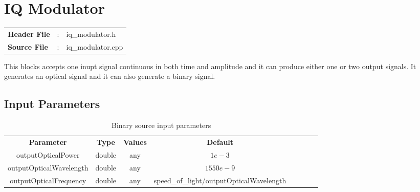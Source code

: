 \clearpage

\section{IQ Modulator}

\begin{tcolorbox}	
	\begin{tabular}{p{2.75cm} p{0.2cm} p{10.5cm}} 	
		\textbf{Header File}   &:& iq\_modulator.h \\
		\textbf{Source File}   &:& iq\_modulator.cpp \\
	\end{tabular}
\end{tcolorbox}

This blocks accepts one inupt signal continuous in both time and amplitude and it can produce either one or two output signals. It generates an optical signal and it can also generate a binary signal.

\subsection*{Input Parameters}

\begin{table}[h]
	\centering
	\begin{tabular}{|c|c|c|c|cccc}
		\cline{1-4}
		\textbf{Parameter} & \textbf{Type} & \textbf{Values} &   \textbf{Default}& \\ \cline{1-4}
		outputOpticalPower & double & any & $1e-3$ \\ \cline{1-4}
		outputOpticalWavelength & double & any & $1550e-9$ \\ \cline{1-4}
		outputOpticalFrequency & double & any & speed\_of\_light/outputOpticalWavelength \\ \cline{1-4}
	\end{tabular}
	\caption{Binary source input parameters}
	\label{table:iqmod_in_par}
\end{table}


